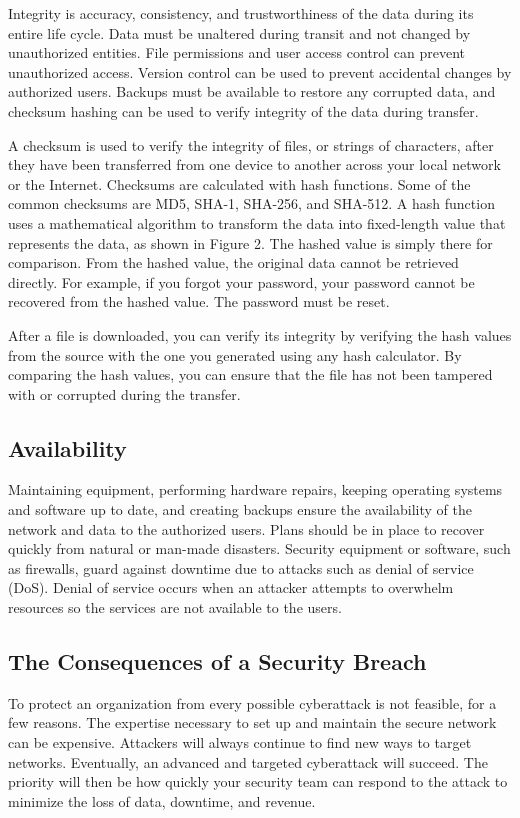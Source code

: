 \documentclass{article}
\begin{document}
Integrity is accuracy, consistency, and trustworthiness of the data during its entire life cycle. Data must be unaltered during transit and not changed by unauthorized entities. File permissions and user access control can prevent unauthorized access. Version control can be used to prevent accidental changes by authorized users. Backups must be available to restore any corrupted data, and checksum hashing can be used to verify integrity of the data during transfer.

A checksum is used to verify the integrity of files, or strings of characters, after they have been transferred from one device to another across your local network or the Internet. Checksums are calculated with hash functions. Some of the common checksums are MD5, SHA-1, SHA-256, and SHA-512. A hash function uses a mathematical algorithm to transform the data into fixed-length value that represents the data, as shown in Figure 2. The hashed value is simply there for comparison. From the hashed value, the original data cannot be retrieved directly. For example, if you forgot your password, your password cannot be recovered from the hashed value. The password must be reset.

After a file is downloaded, you can verify its integrity by verifying the hash values from the source with the one you generated using any hash calculator. By comparing the hash values, you can ensure that the file has not been tampered with or corrupted during the transfer.

\subsection*{Availability}

Maintaining equipment, performing hardware repairs, keeping operating systems and software up to date, and creating backups ensure the availability of the network and data to the authorized users. Plans should be in place to recover quickly from natural or man-made disasters. Security equipment or software, such as firewalls, guard against downtime due to attacks such as denial of service (DoS). Denial of service occurs when an attacker attempts to overwhelm resources so the services are not available to the users.

\subsection{The Consequences of a Security Breach}


To protect an organization from every possible cyberattack is not feasible, for a few reasons. The expertise necessary to set up and maintain the secure network can be expensive. Attackers will always continue to find new ways to target networks. Eventually, an advanced and targeted cyberattack will succeed. The priority will then be how quickly your security team can respond to the attack to minimize the loss of data, downtime, and revenue.
\end{document}
